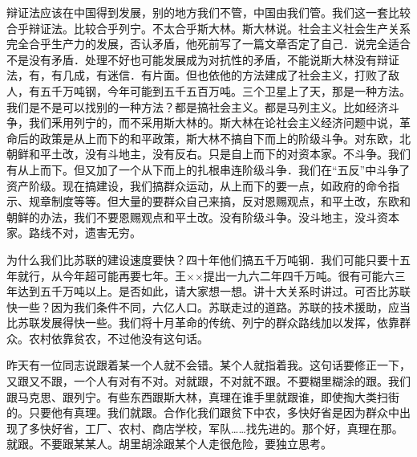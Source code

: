 辩证法应该在中国得到发展，别的地方我们不管，中国由我们管。我们这一套比较合乎辩证法。比较合乎列宁。不太合乎斯大林。斯大林说。社会主义社会生产关系完全合乎生产力的发展，否认矛盾，他死前写了一篇文章否定了自己．说完全适合不是没有矛盾．处理不好也可能发展成为对抗性的矛盾，不能说斯大林没有辩证法，有，有几成，有迷信．有片面。但也依他的方法建成了社会主义，打败了敌人，有五千万吨钢，今年可能到五千五百万吨。三个卫星上了天，那是一种方法。我们是不是可以找别的一种方法？都是搞社会主义。都是马列主义。比如经济斗争，我们釆用列宁的，而不采用斯大林的。斯大林在论社会主义经济问题中说，革命后的政策是从上而下的和平政策，斯大林不搞自下而上的阶级斗争。对东欧，北朝鲜和平土改，没有斗地主，没有反右。只是自上而下的对资本家。不斗争。我们有从上而下。但又加了一个从下而上的扎根串连阶级斗争．我们在“五反”中斗争了资产阶级。现在搞建设，我们搞群众运动，从上而下的要一点，如政府的命令指示、规章制度等等。但大量的要群众自己来搞，反对恩赐观点，和平土改，东欧和朝鲜的办法，我们不要恩赐观点和平土改。没有阶级斗争。没斗地主，没斗资本家。路线不对，遗害无穷。

为什么我们比苏联的建设速度要快？四十年他们搞五千万吨钢．我们可能只要十五年就行，从今年超可能再要七年。王××提出一九六二年四千万吨。很有可能六三年达到五千万吨以上。是否如此，请大家想一想。讲十大关系时讲过。可否比苏联快一些？因为我们条件不同，六亿人口。苏联走过的道路。苏联的技术援助，应当比苏联发展得快一些。我们将十月革命的传统、列宁的群众路线加以发挥，依靠群众。农村依靠贫农，不过他没有这句话。

昨天有一位同志说跟着某一个人就不会错。某个人就指着我。这句话要修正一下，又跟又不跟，一个人有对有不对。对就跟，不对就不跟。不要糊里糊涂的跟。我们跟马克思、跟列宁。有些东西跟斯大林，真理在谁手里就跟谁，即使掏大类扫街的。只要他有真理。我们就跟。合作化我们跟贫下中农，多快好省是因为群众中出现了多快好省，工厂、农村、商店学校，军队……找先进的。那个好，真理在那。就跟。不要跟某某人。胡里胡涂跟某个人走很危险，要独立思考。

